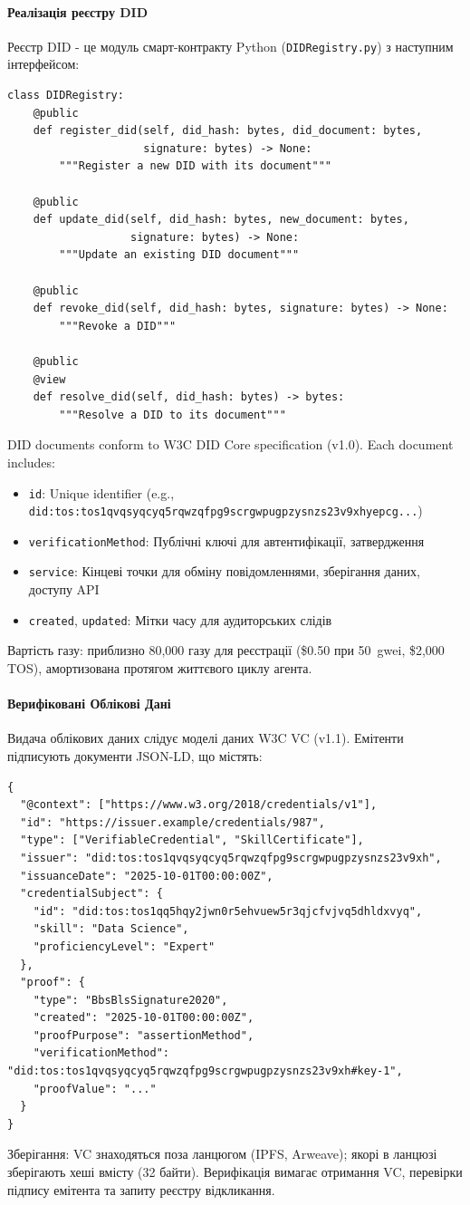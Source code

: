 \documentclass[11pt]{article}
\begin{document}
\paragraph{Реалізація реєстру DID} Реєстр DID - це модуль смарт-контракту Python (\texttt{DIDRegistry.py}) з наступним інтерфейсом:
\begin{verbatim}
class DIDRegistry:
    @public
    def register_did(self, did_hash: bytes, did_document: bytes,
                     signature: bytes) -> None:
        """Register a new DID with its document"""

    @public
    def update_did(self, did_hash: bytes, new_document: bytes,
                   signature: bytes) -> None:
        """Update an existing DID document"""

    @public
    def revoke_did(self, did_hash: bytes, signature: bytes) -> None:
        """Revoke a DID"""

    @public
    @view
    def resolve_did(self, did_hash: bytes) -> bytes:
        """Resolve a DID to its document"""
\end{verbatim}
DID documents conform to W3C DID Core specification (v1.0). Each document includes:
\begin{itemize}[noitemsep]
  \item \texttt{id}: Unique identifier (e.g., \texttt{did:tos:tos1qvqsyqcyq5rqwzqfpg9scrgwpugpzysnzs23v9xhyepcg...})
  \item \texttt{verificationMethod}: Публічні ключі для автентифікації, затвердження
  \item \texttt{service}: Кінцеві точки для обміну повідомленнями, зберігання даних, доступу API
  \item \texttt{created}, \texttt{updated}: Мітки часу для аудиторських слідів
\end{itemize}
Вартість газу: приблизно 80,000 газу для реєстрації (\$0.50 при 50~gwei, \$2,000 TOS), амортизована протягом життєвого циклу агента.

\paragraph{Верифіковані Облікові Дані} Видача облікових даних слідує моделі даних W3C VC (v1.1). Емітенти підписують документи JSON-LD, що містять:
\begin{verbatim}
{
  "@context": ["https://www.w3.org/2018/credentials/v1"],
  "id": "https://issuer.example/credentials/987",
  "type": ["VerifiableCredential", "SkillCertificate"],
  "issuer": "did:tos:tos1qvqsyqcyq5rqwzqfpg9scrgwpugpzysnzs23v9xh",
  "issuanceDate": "2025-10-01T00:00:00Z",
  "credentialSubject": {
    "id": "did:tos:tos1qq5hqy2jwn0r5ehvuew5r3qjcfvjvq5dhldxvyq",
    "skill": "Data Science",
    "proficiencyLevel": "Expert"
  },
  "proof": {
    "type": "BbsBlsSignature2020",
    "created": "2025-10-01T00:00:00Z",
    "proofPurpose": "assertionMethod",
    "verificationMethod": "did:tos:tos1qvqsyqcyq5rqwzqfpg9scrgwpugpzysnzs23v9xh#key-1",
    "proofValue": "..."
  }
}
\end{verbatim}
Зберігання: VC знаходяться поза ланцюгом (IPFS, Arweave); якорі в ланцюзі зберігають хеші вмісту (32 байти). Верифікація вимагає отримання VC, перевірки підпису емітента та запиту реєстру відкликання.
\end{document}

